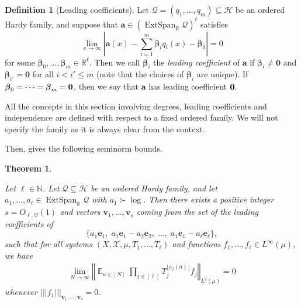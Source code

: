 \documentclass[11pt]{amsart}
\newtheorem{theorem}[lemma]{Theorem}
\theoremstyle{definition}
\newtheorem{definition}[lemma]{Definition}
\DeclareMathOperator*{\E}{\mathbb{E}}
\newcommand{\N}{{\mathbb N}}
\newcommand{\R}{{\mathbb R}}
\newcommand{\CH}{{\mathcal H}}
\newcommand{\CQ}{{\mathcal Q}}
\newcommand{\CX}{{\mathcal X}}
\newcommand{\ba}{\mathbf{a}}
\newcommand{\be}{{\mathbf{e}}}
\newcommand{\bv}{{\mathbf{v}}}
\newcommand{\bbeta}{{\boldsymbol{\beta}}}
\newcommand{\norm}[1]{\left\Vert #1\right\Vert}
\newcommand{\nnorm}[1]{\lvert\!|\!| #1|\!|\!\rvert}
\newcommand{\1}{{\mathbf{1}}}
\DeclareMathOperator{\extspan}{ExtSpan}
\newcommand{\abs}[1]{\mathopen{}\left| #1\mathclose{}\right|}
\newcommand{\sfloor}[1]{{\lfloor #1 \rfloor}}
\begin{document}
\begin{definition}[Leading coefficients]\label{d43}
    Let $\CQ = (q_1, \ldots, q_m)\subseteq\CH$ be an ordered Hardy family, and suppose that $\ba\in(\extspan_\R\CQ)^\ell$ satisfies $$\lim_{x\to\infty}\abs{\ba(x) - \sum\limits_{i=1}^m \bbeta_i q_i(x) - \bbeta_0} = {0}$$ for some $\bbeta_0, \ldots,\bbeta_m\in\R^\ell$. Then we call $\bbeta_i$ the \textit{leading coefficient} of $\ba$ if $\bbeta_i\neq \mathbf{0}$ and $\bbeta_{i'} = \mathbf{0}$ for all $i<i'\leq m$ {(note that the choices of $\bbeta_{i}$ are unique)}. If $\bbeta_0 = \cdots = \bbeta_m = \bf{0}$, then we say that $\ba$ has leading coefficient $\bf{0}.$
\end{definition}

All the concepts in this section involving degrees, leading coefficients and independence are defined with respect to a fixed ordered family. We will not specify the family as it is always clear from the context.

Then, \cite[Theorem 10.1]{DKKST24} gives the following seminorm bounds. 
     \begin{theorem}\label{T: old estimates}

        Let $\ell\in\N$. Let $\CQ\subseteq\CH$ be an ordered Hardy family, and let $a_1, \ldots, a_\ell\in\extspan_\R\CQ$ with $a_1\succ \log$. Then there exists a positive integer $s=O_{\ell, \CQ}(1)$ and vectors $\bv_{1},\dots,\bv_{s}$ coming from the set of the leading coefficients of $$\{a_1 \be_1,\; a_1 \be_1 - a_2 \be_2,\; \ldots,\; a_1 \be_1 - a_\ell \be_\ell\},$$
         such that for all systems $(X, \CX, \mu, T_1, \ldots, T_\ell)$ and functions $f_1, \ldots, f_\ell\in L^\infty(\mu)$, we have 
\begin{align*}%
         \lim_{N\to\infty} %
         \norm{\E_{n\in [N]} 
         \prod_{j\in[\ell]}  T_{j}^{\sfloor{a_{j}(n)}} f_{j}}_{L^2(\mu)}=0
    \end{align*}
    whenever $\nnorm{f_1}_{\bv_{1},\dots,\bv_{s}}=0$.
    \end{theorem}
\end{document}
